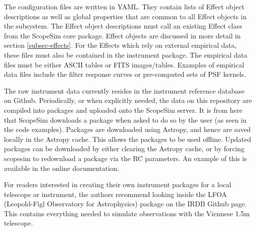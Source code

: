 The configuration files are written in YAML.
They contain lists of Effect object descriptions as well as global properties that are common to all Effect objects in the subsystem.
The Effect object descriptions must call an existing Effect class from the ScopeSim core package.
Effect objects are discussed in more detail in section \ref{subsec-effects}.
For the Effects which rely on external empirical data, these files must also be contained in the instrument package.
The empirical data files must be either ASCII tables or FITS images/tables.
Examples of empirical data files include the filter response curves or pre-computed sets of PSF kernels.

The raw instrument data currently resides in the instrument reference database on Github.
Periodically, or when explicitly needed, the data on this repository are compiled into packages and uploaded onto the ScopeSim server.
It is from here that ScopeSim downloads a package when asked to do so by the user (as seen in the code examples).
Packages are downloaded using Astropy, and hence are saved locally in the Astropy cache.
This allows the packages to be used offline.
Updated packages can be downloaded by either clearing the Astropy cache, or by forcing scopesim to redownload a package via the RC parameters.
An example of this is available in the online documentation.

For readers interested in creating their own instrument packages for a local telescope or instrument, the authors recommend looking inside the LFOA (Leopold-Figl Observatory for Astrophysics) package on the IRDB Github page.
This contains everything needed to simulate observations with the Viennese 1.5m telescope.
